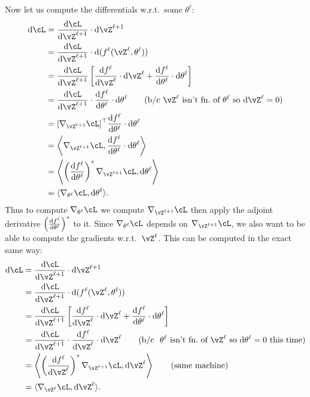 \documentclass[../../book-main.tex]{subfiles}
\begin{document}
Now let us compute the differentials w.r.t.~some \(\theta^{\ell}\):
\begin{align}
    \odif{\cL}
    &= \odv{\cL}{\vZ^{\ell + 1}}\cdot \odif{\vZ^{\ell + 1}} \\ 
    &= \odv{\cL}{\vZ^{\ell + 1}}\cdot \odif{{(f^{\ell}(\vZ^{\ell}, \theta^{\ell}))}} \\
    &= \odv{\cL}{\vZ^{\ell + 1}}\bs{\odv{f^{\ell}}{\vZ^{\ell}}\cdot\odif{\vZ}^{\ell} + \odv{f^{\ell}}{\theta^{\ell}}\cdot\odif{\theta}^{\ell}} \\
    &= \odv{\cL}{\vZ^{\ell + 1}}\cdot \odv{f^{\ell}}{\theta^{\ell}}\cdot\odif{\theta}^{\ell} \qquad \text{(b/c~\(\vZ^{\ell}\) isn't fn.~of \(\theta^{\ell}\) so \(\odif{\vZ}^{\ell} = 0\))} \\
    &= [\nabla_{\vZ^{\ell + 1}}\cL]^{\top}\odv{f^{\ell}}{\theta^{\ell}}\cdot\odif{\theta}^{\ell} \\ 
    &= \ip*{\nabla_{\vZ^{\ell + 1}}\cL}{\odv{f^{\ell}}{\theta^{\ell}}\cdot\odif{\theta}^{\ell}} \\
    &= \ip*{\bp{\odv{f^{\ell}}{\theta^{\ell}}}^{*}\nabla_{\vZ^{\ell + 1}}\cL}{\odif{\theta}^{\ell}} \\ 
    &= \ip{\nabla_{\theta^{\ell}}\cL}{\odif{\theta}^{\ell}}.
\end{align}
Thus to compute \(\nabla_{\theta^{\ell}}\cL\) we compute \(\nabla_{\vZ^{\ell + 1}}\cL\) then apply the adjoint derivative \(\bp{\odv{f^{\ell}}{\theta^{\ell}}}^{*}\) to it. Since \(\nabla_{\theta^{\ell}}\cL\) depends on \(\nabla_{\vZ^{\ell + 1}}\cL\), we also want to be able to compute the gradients w.r.t.~\(\vZ^{\ell}\). This can be computed in the exact same way:
\begin{align}
    \odif{\cL}
    &= \odv{\cL}{\vZ^{\ell + 1}}\cdot \odif{\vZ^{\ell + 1}} \\ 
    &= \odv{\cL}{\vZ^{\ell + 1}}\cdot\odif{{(f^{\ell}(\vZ^{\ell}, \theta^{\ell}))}} \\
    &= \odv{\cL}{\vZ^{\ell + 1}}\bs{\odv{f^{\ell}}{\vZ^{\ell}}\cdot\odif{\vZ}^{\ell} + \odv{f^{\ell}}{\theta^{\ell}}\cdot\odif{\theta}^{\ell}} \\
    &= \odv{\cL}{\vZ^{\ell + 1}}\cdot\odv{f^{\ell}}{\vZ^{\ell}}\cdot\odif{\vZ}^{\ell} \qquad \text{(b/c~~\(\theta^{\ell}\) isn't fn.~of \(\vZ^{\ell}\) so \(\odif{\theta}^{\ell} = 0\) this time)} \\ 
    &= \ip*{\bp{\odv{f^{\ell}}{\vZ^{\ell}}}^{*}\nabla_{\vZ^{\ell + 1}}\cL}{\odif{\vZ}^{\ell}} \qquad \text{(same machine)} \\ 
    &= \ip{\nabla_{\vZ^{\ell}}\cL}{\odif{\vZ}^{\ell}}.
\end{align}
\end{document}
